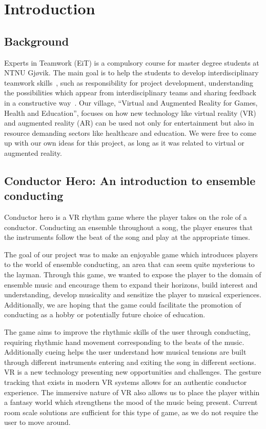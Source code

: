 \chapter{Introduction}

\section{Background}
Experts in Teamwork (EiT) is a compulsory course for master degree students at NTNU Gjøvik. The main goal is to help the students to develop interdisciplinary teamwork skills~\cite{eit}, such as responsibility for project development, understanding the possibilities which appear from interdisciplinary teams and sharing feedback in a constructive way~\cite{eitQA}. Our village, “Virtual and Augmented Reality for Games, Health and Education”, focuses on how new technology like virtual reality (VR) and augmented reality (AR) can be used not only for entertainment but also in resource demanding sectors like healthcare and education. We were free to come up with our own ideas for this project, as long as it was related to virtual or augmented reality.
\section{Conductor Hero: An introduction to ensemble conducting}
Conductor hero is a VR rhythm game where the player takes on the role of a conductor. Conducting an ensemble throughout a song, the player ensures that the instruments follow the beat of the song and play at the appropriate times. 

The goal of our project was to make an enjoyable game which introduces players to the world of ensemble conducting, an area that can seem quite mysterious to the layman. Through this game, we wanted to expose the player to the domain of ensemble music and encourage them to expand their horizons, build interest and understanding, develop musicality and sensitize the player to musical experiences. Additionally, we are hoping that the game could facilitate the promotion of conducting as a hobby or potentially future choice of education.

The game aims to improve the rhythmic skills of the user through conducting, requiring rhythmic hand movement corresponding to the beats of the music. Additionally cueing helps the user understand how musical tensions are built through different instruments entering and exiting the song in different sections.
VR is a new technology presenting new opportunities and challenges. The gesture tracking that exists in modern VR systems allows for an authentic conductor experience. The immersive nature of VR also allows us to place the player within a fantasy world which strengthens the mood of the music being present. Current room scale solutions are sufficient for this type of game, as we do not require the user to move around.


